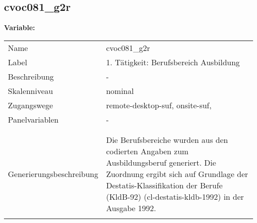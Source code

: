 	
	
	\subsection{cvoc081\_g2r}
	\label{subSection:cvoc081_g2r}

	\noindent\textbf{Variable:}\\
		\begin{tabular}{lL{11.3cm}}
			\label{tableVariable:cvoc081_g2r}
			Name & cvoc081\_g2r \\
			Label & 1. Tätigkeit: Berufsbereich Ausbildung \\
			Beschreibung & - \\
			Skalenniveau & nominal \\
			Zugangswege &
				remote-desktop-suf,
				onsite-suf,
 \\
			Panelvariablen & -
			 \\
			 \\
 \\
					Generierungsbeschreibung & Die Berufsbereiche wurden aus den codierten Angaben zum Ausbildungsberuf generiert. Die Zuordnung ergibt sich auf Grundlage der Destatis-Klassifikation der Berufe (KldB-92) (cl-destatis-kldb-1992) in der Ausgabe 1992. 
				 \\	
			 \\
		\end{tabular}






